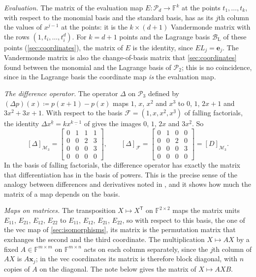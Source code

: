 \emph{Evaluation.} The matrix of the evaluation map $E\colon\mathcal P_d\to\mathbb F^k$ at the points $t_1,\ldots,t_k$, with respect to the monomial basis and the standard basis, has as its $j$th column the values of $x^{j-1}$ at the points: it is the $k\times(d+1)$ Vandermonde matrix with the rows $(1,t_i,\ldots,t_i^d)$. For $k=d+1$ points and the Lagrange basis $\mathcal B_{\mathrm L}$ of these points (\cref{sec:coordinates}), the matrix of $E$ is the identity, since $EL_j=\mathbf e_j$. The Vandermonde matrix is also the change-of-basis matrix that \cref{sec:coordinates} found between the monomial and the Lagrange basis of $\mathcal P_2$; this is no coincidence, since in the Lagrange basis the coordinate map \emph{is} the evaluation map.

\emph{The difference operator.} The operator $\Delta$ on $\mathcal P_3$ defined by $(\Delta p)(x)\coloneqq p(x+1)-p(x)$ maps $1$, $x$, $x^2$ and $x^3$ to $0$, $1$, $2x+1$ and $3x^2+3x+1$. With respect to the basis $\mathcal F=(1,x,x^{\underline2},x^{\underline3})$ of falling factorials, the identity $\Delta x^{\underline k}=kx^{\underline{k-1}}$ of  gives the images $0$, $1$, $2x$ and $3x^{\underline2}$. So
\[
[\Delta]_{\mathcal M_3}=\begin{bmatrix}0&1&1&1\\0&0&2&3\\0&0&0&3\\0&0&0&0\end{bmatrix},\qquad
[\Delta]_{\mathcal F}=\begin{bmatrix}0&1&0&0\\0&0&2&0\\0&0&0&3\\0&0&0&0\end{bmatrix}=[D]_{\mathcal M_3}.
\]
In the basis of falling factorials, the difference operator has exactly the matrix that differentiation has in the basis of powers. This is the precise sense of the analogy between differences and derivatives noted in , and it shows how much the matrix of a map depends on the basis.

\emph{Maps on matrices.} The transposition $X\mapsto X^{\mathsf T}$ on $\mathbb F^{2\times2}$ maps the matrix units $E_{11}$, $E_{21}$, $E_{12}$, $E_{22}$ to $E_{11}$, $E_{12}$, $E_{21}$, $E_{22}$, so with respect to this basis, the one of the vec map of \cref{sec:isomorphisms}, its matrix is the permutation matrix that exchanges the second and the third coordinate. The multiplication $X\mapsto AX$ by a fixed $A\in\mathbb F^{m\times m}$ on $\mathbb F^{m\times n}$ acts on each column separately, since the $j$th column of $AX$ is $A\mathbf x_j$; in the vec coordinates its matrix is therefore block diagonal, with $n$ copies of $A$ on the diagonal. The note below gives the matrix of $X\mapsto AXB$.

